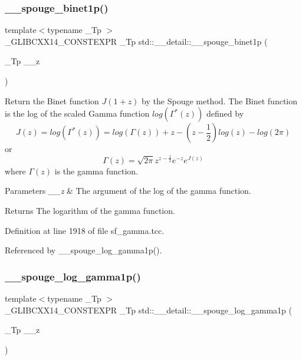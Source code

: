\subsubsection{\texorpdfstring{\+\_\+\+\_\+spouge\+\_\+binet1p()}{\_\_spouge\_binet1p()}}
{\footnotesize\ttfamily template$<$typename \+\_\+\+Tp $>$ \\
\+\_\+\+G\+L\+I\+B\+C\+X\+X14\+\_\+\+C\+O\+N\+S\+T\+E\+X\+PR \+\_\+\+Tp std\+::\+\_\+\+\_\+detail\+::\+\_\+\+\_\+spouge\+\_\+binet1p (\begin{DoxyParamCaption}\item[{\+\_\+\+Tp}]{\+\_\+\+\_\+z }\end{DoxyParamCaption})}



Return the Binet function $ J(1+z) $ by the Spouge method. The Binet function is the log of the scaled Gamma function $ log(\Gamma^*(z)) $ defined by \[ J(z) = log(\Gamma^*(z)) = log\left(\Gamma(z)\right) + z - \left(z-\frac{1}{2}\right) log(z) - log(2\pi) \] or \[ \Gamma(z) = \sqrt{2\pi}z^{z-\frac{1}{2}}e^{-z}e^{J(z)} \] where $ \Gamma(z) $ is the gamma function. 


\begin{DoxyParams}{Parameters}
{\em \+\_\+\+\_\+z} & The argument of the log of the gamma function. \\
\hline
\end{DoxyParams}
\begin{DoxyReturn}{Returns}
The logarithm of the gamma function. 
\end{DoxyReturn}


Definition at line 1918 of file sf\+\_\+gamma.\+tcc.



Referenced by \+\_\+\+\_\+spouge\+\_\+log\+\_\+gamma1p().

\mbox{\label{namespacestd_1_1____detail_a29cdf96d3726e15cb0652736971ba5a9}} 
\subsubsection{\texorpdfstring{\+\_\+\+\_\+spouge\+\_\+log\+\_\+gamma1p()}{\_\_spouge\_log\_gamma1p()}}
{\footnotesize\ttfamily template$<$typename \+\_\+\+Tp $>$ \\
\+\_\+\+G\+L\+I\+B\+C\+X\+X14\+\_\+\+C\+O\+N\+S\+T\+E\+X\+PR \+\_\+\+Tp std\+::\+\_\+\+\_\+detail\+::\+\_\+\+\_\+spouge\+\_\+log\+\_\+gamma1p (\begin{DoxyParamCaption}\item[{\+\_\+\+Tp}]{\+\_\+\+\_\+z }\end{DoxyParamCaption})}




